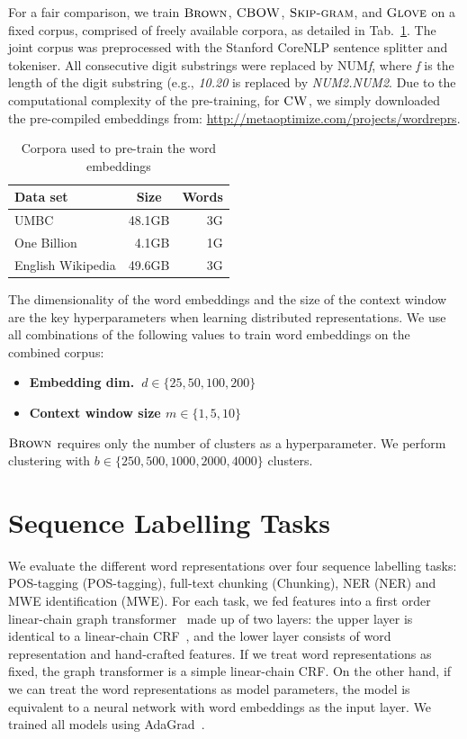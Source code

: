 \documentclass[11pt]{article}
\newcommand{\tabref}[2][]{Tab#1.~\ref{#2}\xspace}
\newcommand{\lex}[1]{\textit{#1}\xspace}
\newcommand{\method}[2][]{\ensuremath{\textsc{#2#1}}\xspace}
\newcommand{\brown}[1][]{\method[\ensuremath{_{#1}}]{Brown}}
\newcommand{\CW}[1][]{\method[#1]{CW}}
\newcommand{\CBOW}[1][]{\method[#1]{CBOW}}
\newcommand{\Skipgram}[1][]{\method[#1]{Skip-gram}}
\newcommand{\Glove}[1][]{\method[#1]{Glove}}
\newcommand{\task}[1]{\textsf{#1}\xspace}
\newcommand{\pos}{\task{POS-tagging}}
\newcommand{\chunking}{\task{Chunking}}
\newcommand{\ner}{\task{NER}}
\newcommand{\mwe}{\task{MWE}}
\begin{document}
For a fair comparison, we train \brown, \CBOW, \Skipgram, and \Glove on
a fixed corpus, comprised of freely available corpora, as detailed in
\tabref{wordEmbedCorpora}. The joint corpus was preprocessed with the
Stanford CoreNLP sentence splitter and tokeniser. All consecutive digit
substrings were replaced by NUM\textit{f}, where \textit{f} is the
length of the digit substring (e.g., \lex{10.20} is replaced by
\lex{NUM2.NUM2}. Due to the computational complexity of the
pre-training, for \CW, we simply downloaded the pre-compiled embeddings from:
\url{http://metaoptimize.com/projects/wordreprs}.

\begin{table}[t]
\centering
\begin{tabular}{lrr}
\hline
\textbf{Data set} & \multicolumn{1}{c}{\textbf{Size}} & \multicolumn{1}{c}{\textbf{Words}} \\ \hline
UMBC 	& 48.1GB & 3G \\
One Billion 	& 4.1GB & 1G  \\
English Wikipedia & 49.6GB & 3G \\ \hline
\end{tabular}
\caption{Corpora used to pre-train the word embeddings}
\label{wordEmbedCorpora}
\end{table}

The dimensionality of the word embeddings and the size of the context
window are the key hyperparameters when learning distributed
representations. We use all combinations of the following values to
train word embeddings on the combined corpus:
\begin{itemize}
\item \textbf{Embedding dim.\ $d \in \{25, 50, 100, 200\}$}
\item \textbf{Context window size $m \in \{1, 5, 10\}$}
\end{itemize}
\brown requires only the number of clusters as a hyperparameter. We
perform clustering with $b \in \{250, 500, 1000, 2000, 4000\}$ clusters.



\section{Sequence Labelling Tasks}
\label{sec:SeqTagging}

We evaluate the different word representations over four sequence
labelling tasks: POS-tagging (\pos), full-text chunking (\chunking),
NER (\ner) and MWE identification (\mwe). For
each task, we fed features into a first order linear-chain graph
transformer~\cite{collobert2011natural} made up of two layers: the upper
layer is identical to a linear-chain CRF~\cite{lafferty2001conditional},
and the lower layer consists of word representation and hand-crafted
features. If we treat word representations as fixed, the graph
transformer is a simple linear-chain CRF. On the other hand, if we can
treat the word representations as model parameters, the model is
equivalent to a neural network with word embeddings as the input
layer. We trained all models using AdaGrad~\cite{duchi2011adaptive}.
\end{document}
